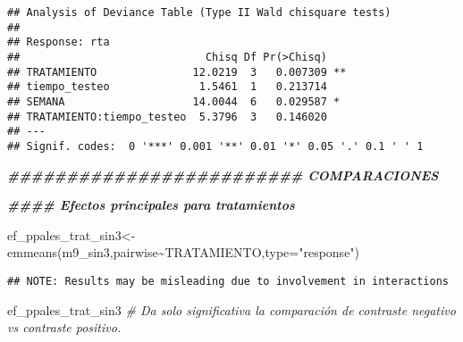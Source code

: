 \documentclass[
]{article}
\newenvironment{Shaded}{\begin{snugshade}}{\end{snugshade}}
\newcommand{\AttributeTok}[1]{\textcolor[rgb]{0.77,0.63,0.00}{#1}}
\newcommand{\CommentTok}[1]{\textcolor[rgb]{0.56,0.35,0.01}{\textit{#1}}}
\newcommand{\DocumentationTok}[1]{\textcolor[rgb]{0.56,0.35,0.01}{\textbf{\textit{#1}}}}
\newcommand{\FunctionTok}[1]{\textcolor[rgb]{0.00,0.00,0.00}{#1}}
\newcommand{\NormalTok}[1]{#1}
\newcommand{\OtherTok}[1]{\textcolor[rgb]{0.56,0.35,0.01}{#1}}
\newcommand{\SpecialCharTok}[1]{\textcolor[rgb]{0.00,0.00,0.00}{#1}}
\newcommand{\StringTok}[1]{\textcolor[rgb]{0.31,0.60,0.02}{#1}}
\begin{document}
\begin{verbatim}
## Analysis of Deviance Table (Type II Wald chisquare tests)
## 
## Response: rta
##                             Chisq Df Pr(>Chisq)   
## TRATAMIENTO               12.0219  3   0.007309 **
## tiempo_testeo              1.5461  1   0.213714   
## SEMANA                    14.0044  6   0.029587 * 
## TRATAMIENTO:tiempo_testeo  5.3796  3   0.146020   
## ---
## Signif. codes:  0 '***' 0.001 '**' 0.01 '*' 0.05 '.' 0.1 ' ' 1
\end{verbatim}

\begin{Shaded}
\begin{Highlighting}[]
\DocumentationTok{\#\#\#\#\#\#\#\#\#\#\#\#\#\#\#\#\#\#\#\#\#\#\#\#\# COMPARACIONES}

\DocumentationTok{\#\#\#\# Efectos principales para tratamientos}

\NormalTok{ef\_ppales\_trat\_sin3}\OtherTok{\textless{}{-}}\FunctionTok{emmeans}\NormalTok{(m9\_sin3,pairwise}\SpecialCharTok{\textasciitilde{}}\NormalTok{TRATAMIENTO,}\AttributeTok{type=}\StringTok{"response"}\NormalTok{)}
\end{Highlighting}
\end{Shaded}

\begin{verbatim}
## NOTE: Results may be misleading due to involvement in interactions
\end{verbatim}

\begin{Shaded}
\begin{Highlighting}[]
\NormalTok{ef\_ppales\_trat\_sin3 }\CommentTok{\# Da solo significativa la comparación de contraste negativo vs contraste positivo.}
\end{Highlighting}
\end{Shaded}
\end{document}
